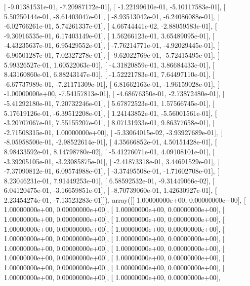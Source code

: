 \documentclass{article}
\begin{document}
       [ -9.01381531e-01,  -7.20987172e-01],
       [ -1.22199610e-01,  -5.10117583e-01],
       [  5.50250144e-01,  -8.61403047e-01],
       [ -8.93513042e-01,  -6.24086088e-01],
       [ -6.02766261e-01,   5.74261337e-01],
       [  4.66744441e-02,  -2.88059583e-01],
       [ -9.30916535e-01,   6.17403149e-01],
       [  1.56266123e-01,   3.65489095e-01],
       [ -4.43235637e-01,   6.95429552e-01],
       [ -7.76214771e-01,  -4.92029445e-01],
       [ -6.90501287e-01,   7.02327278e-01],
       [ -9.62022769e-01,  -5.72415495e-01],
       [  5.99326527e-01,   1.60522063e-01],
       [ -4.31820859e-01,   3.86684433e-01],
       [  8.43160860e-01,   6.88243147e-01],
       [ -1.52221783e-01,   7.64497110e-01],
       [ -6.67737989e-01,  -7.21171309e-01],
       [  6.81662163e-01,  -1.96159028e-01],
       [ -1.00000000e+00,  -7.54157813e-01],
       [ -4.68676350e-01,  -2.73872480e-01],
       [ -5.41292180e-01,   7.20732246e-01],
       [  5.67872523e-01,   1.57566745e-01],
       [  5.17619126e-01,  -6.39512208e-01],
       [  1.24143852e-01,  -5.56001561e-01],
       [ -3.20707067e-01,   7.55155207e-01],
       [  8.07131933e-01,   9.86377658e-01],
       [ -2.71508315e-01,   1.00000000e+00],
       [ -5.33064015e-02,  -3.93927689e-01],
       [ -8.05958500e-01,  -2.98522614e-01],
       [  4.35666852e-01,   4.50151428e-01],
       [  8.98433592e-01,   8.14798780e-02],
       [ -5.41276071e-01,   4.09108101e-01],
       [ -3.39205105e-01,  -3.23085875e-01],
       [ -2.41873318e-01,   3.44691529e-01],
       [ -7.37090812e-01,   6.09574988e-01],
       [ -3.37495508e-01,  -1.71602708e-01],
       [  8.23046231e-01,   7.91449253e-01],
       [  6.58592532e-01,  -9.31449066e-02],
       [  6.04120475e-01,  -3.16659851e-01],
       [ -8.70739060e-01,   1.42630927e-01],
       [  2.23454274e-01,  -7.13523283e-01]]), array([[  1.00000000e+00,   0.00000000e+00],
       [  1.00000000e+00,   0.00000000e+00],
       [  1.00000000e+00,   0.00000000e+00],
       [  1.00000000e+00,   0.00000000e+00],
       [  1.00000000e+00,   0.00000000e+00],
       [  1.00000000e+00,   0.00000000e+00],
       [  1.00000000e+00,   0.00000000e+00],
       [  1.00000000e+00,   0.00000000e+00],
       [  1.00000000e+00,   0.00000000e+00],
       [  1.00000000e+00,   0.00000000e+00],
       [  1.00000000e+00,   0.00000000e+00],
       [  1.00000000e+00,   0.00000000e+00],
       [  1.00000000e+00,   0.00000000e+00],
       [  1.00000000e+00,   0.00000000e+00],
       [  1.00000000e+00,   0.00000000e+00],
       [  1.00000000e+00,   0.00000000e+00],
       [  1.00000000e+00,   0.00000000e+00],
\end{document}
